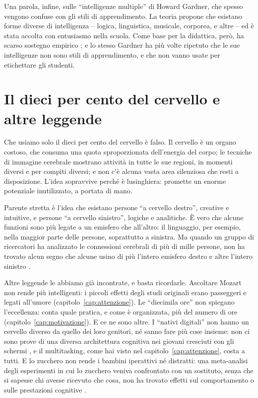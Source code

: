 Una parola, infine, sulle \enquote{intelligenze multiple} di Howard
Gardner, che spesso vengono confuse con gli stili di apprendimento. La
teoria propone che esistano forme diverse di intelligenza -- logica,
linguistica, musicale, corporea, e altre -- ed è stata accolta con
entusiasmo nella scuola. Come base per la didattica, però, ha scarso
sostegno empirico \parencite{waterhouse2006}; e lo stesso Gardner ha
più volte ripetuto che le sue intelligenze non sono stili di
apprendimento, e che non vanno usate per etichettare gli studenti.

\section{Il dieci per cento del cervello e altre leggende}

Che usiamo solo il dieci per cento del cervello è falso. Il cervello è
un organo costoso, che consuma una quota sproporzionata dell'energia
del corpo; le tecniche di immagine cerebrale mostrano attività in
tutte le sue regioni, in momenti diversi e per compiti diversi; e non
c'è alcuna vasta area silenziosa che resti a disposizione. L'idea sopravvive perché è lusinghiera: promette un
enorme potenziale inutilizzato, a portata di mano.

Parente stretta è l'idea che esistano persone \enquote{a cervello
destro}, creative e intuitive, e persone \enquote{a cervello
sinistro}, logiche e analitiche. È vero che alcune funzioni sono più
legate a un emisfero che all'altro: il linguaggio, per esempio, nella
maggior parte delle persone, soprattutto a sinistra. Ma quando un
gruppo di ricercatori ha analizzato le connessioni cerebrali di più di
mille persone, non ha trovato alcun segno che alcune usino di più
l'intero emisfero destro e altre l'intero sinistro \parencite{nielsen2013}.

Altre leggende le abbiamo già incontrate, e basta ricordarle. Ascoltare
Mozart non rende più intelligenti: i piccoli effetti degli studi
originali erano passeggeri e legati all'umore
(capitolo~\ref{cap:attenzione}). Le \enquote{diecimila ore} non
spiegano l'eccellenza: conta quale pratica, e come è organizzata, più
del numero di ore (capitolo~\ref{cap:motivazione}). E ce ne sono
altre. I \enquote{nativi digitali} non hanno un cervello diverso da
quello dei loro genitori, né sanno fare più cose insieme: non ci sono
prove di una diversa architettura cognitiva nei giovani cresciuti con
gli schermi \parencite{kirschner2017}, e il multitasking, come hai
visto nel capitolo~\ref{cap:attenzione}, costa a tutti. E lo
zucchero non rende i bambini iperattivi né distratti: una meta-analisi
degli esperimenti in cui lo zucchero veniva confrontato con un
sostituto, senza che si sapesse chi avesse ricevuto che cosa, non ha
trovato effetti sul comportamento o sulle prestazioni cognitive \parencite{wolraich1995}.

